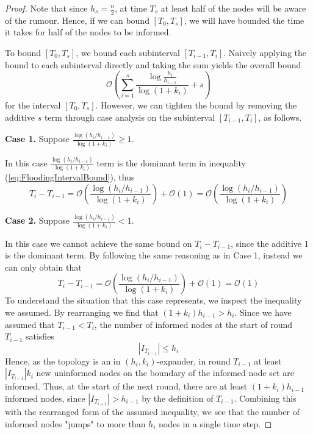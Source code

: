 \begin{proof}
	Note that since $h_s = \frac{n}{2}$, at time $T_s$ at least half of the nodes will be aware of the rumour. Hence, if we can bound $[T_0, T_s]$, we will have bounded the time it takes for half of the nodes to be informed. 

	To bound $[T_0, T_s]$, we bound each subinterval $[T_{i-1}, T_i]$. Naively applying the bound to each subinterval directly and taking the sum yields the overall bound 
	$$
		\mathcal{O}\left(\sum_{i=1}^s \frac{\log \frac{h_i}{h_{i-1}}}{\log(1+k_i)} + s\right)
	$$ 
	for the interval $[T_0,T_s]$. However, we can tighten the bound by removing the additive $s$ term through case analysis on the subinterval $[T_{i-1}, T_i]$, as follows.




	\textbf{Case 1.} Suppose $\frac{\log (h_i/h_{i-1})}{\log(1+k_i)} \geq 1$.

	In this case $\frac{\log (h_i/h_{i-1})}{\log(1+k_i)}$ term is the dominant term in inequality (\ref{eq:FloodingIntervalBound}), thus
	$$
		T_i - T_{i-1} = \mathcal{O}\left( \frac{\log (h_i/h_{i-1})}{\log(1+k_i) }\right) + \mathcal{O}(1) = \mathcal{O}\left( \frac{\log (h_i/h_{i-1})}{\log(1+k_i) }\right)
	$$

	\textbf{Case 2.} Suppose $\frac{\log (h_i/h_{i-1})}{\log(1+k_i)} < 1$.

	In this case we cannot achieve the same bound on $T_i - T_{i-1}$, since the additive 1 is the dominant term. By following the same reasoning as in Case 1, instead we can only obtain that
	\begin{equation}\label{eq:Weak1StepBound}
		T_i - T_{i-1} = \mathcal{O}\left( \frac{\log (h_i/h_{i-1})}{\log(1+k_i) }\right) + \mathcal{O}(1) = \mathcal{O}(1)
	\end{equation}
	To understand the situation that this case represents, we inspect the inequality we assumed.
	By rearranging we find that $(1+k_i)h_{i-1} > h_i$. Since we have assumed that $T_{i-1} < T_i$, %
	the number of informed nodes at the start of round $T_{i-1}$ satisfies
	$$
		|I_{T_{i-1}}| \leq h_i
	$$
	Hence, as the topology is an in $(h_i, k_i)$-expander, in round $T_{i-1}$ at least $|I_{T_{i-1}}|k_i$ new uninformed nodes on the boundary of the informed node set are informed. Thus, at the start of the next round, there are at least $(1+k_i)h_{i-1}$ informed nodes, since $|I_{T_{i-1}}| > h_{i-1}$ by the definition of $T_{i-1}$. Combining this with the rearranged form of the assumed inequality, we see that the number of informed nodes "jumps" to more than $h_i$ nodes in a single time step.


\end{proof}
